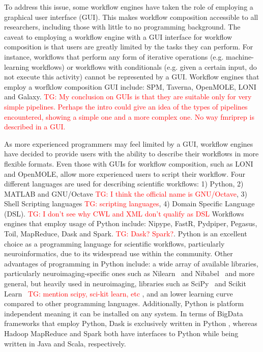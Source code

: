 \documentclass{report}
\newcommand{\tristan}[1]{\textcolor{red}{TG: #1}}
\begin{document}
            To address this issue, some workflow engines have taken the role
            of employing a graphical user interface (GUI). This makes workflow 
            composition accessible to all researchers, including those with
            little to no programming background. The caveat to employing a 
            workflow engine with a GUI interface for workflow composition is
            that users are greatly limited by the tasks they can perform. For 
            instance, workflows that perform any form of iterative operations
            (e.g. machine-learning workflows) or workflows with conditionals
            (e.g. given a certain input, do not execute this activity) cannot
            be represented by a GUI. 
            Workflow engines that employ a worfklow composition GUI include:
            SPM, Taverna, OpenMOLE, LONI and Galaxy.
            \tristan{My conclusion on GUIs is that they are suitable only
            for very simple pipelines. Perhaps the intro could give an idea
            of the types of pipelines encountered, showing a simple one and
            a more complex one. No way fmriprep is described in a GUI.}

            As more experienced programmers may feel limited by a GUI, workflow
            engines have decided to provide users with the ability to describe
            their workflows in more flexible formats. Even those with GUIs for 
            workflow composition, such as LONI and OpenMOLE, allow more 
            experienced users to script their workflow. Four different 
            languages are used for describing scientific workflows: 1) Python, 
            2) MATLAB and GNU/Octave \tristan{I think the official name is GNU/Octave}, 3) Shell Scripting languages \tristan{scripting languages}, 4) Domain Specific Language (DSL). \tristan{I don't see why CWL and XML don't qualify as DSL} Workflows engines that 
            employ usage of Python include: Nipype, FastR, Pydpiper, Pegasus, Toil,
            MapReduce, Dask and Spark. \tristan{Dask? Spark?}.
            Python is an excellent choice as a programming language for 
            scientific workflows, particularly neuroinformatics, due to its 
            widespread use within the community. Other advantages of 
            programming in Python include: a wide array of available libraries,
            particularly neuroimaging-specific ones such as Nilearn~\cite{nilearn} and Nibabel~\cite{matthew_brett_2018_1287921}
            and more general, but heavily used in neuroimaging, libraries such
            as SciPy~\cite{scipy} and Scikit Learn~\cite{pedregosa2011scikit} \tristan{mention scipy, sci-kit learn, etc}
            , and an lower learning curve compared to other 
            programming languages. Additionally, Python is platform independent
            meaning it can be installed on any system. In terms of BigData 
            frameworks that employ Python, Dask is exclusively written in Python
            , whereas Hadoop MapReduce and Spark both have interfaces to Python
            while being written in Java and Scala, respectively.
\end{document}
